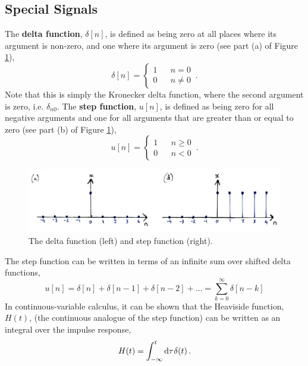 \subsection{Special Signals}
%
The \textbf{delta function}, $\delta[n]$, is defined as being zero at all places where its argument
is non-zero, and one where its argument is zero (see part (a) of Figure \ref{fig::lecture_1_delta_and_step}),
%
\begin{equation}
  \delta[n] = \left\{\begin{array}{ccl}
    1 & & n = 0 \\
    0 & & n \neq 0
  \end{array}\right. \,.
\end{equation}
%
Note that this is simply the Kronecker delta function, where the second argument is zero, i.e. $\delta_{n0}$.
The \textbf{step function}, $u[n]$, is defined as being zero for all negative arguments and one for
all arguments that are greater than or equal to zero (see part (b) of Figure
\ref{fig::lecture_1_delta_and_step}),
%
\begin{equation}
  u[n] = \left\{\begin{array}{ccl}
    1 & & n \geq 0 \\
    0 & & n < 0
  \end{array}\right. \,.
\end{equation}
%
\begin{figure}[!htb]
  \includegraphics[width=\textwidth]{images/lecture_1_delta_and_step.JPG}
  \caption{
    The delta function (left) and step function (right).
  }
  \label{fig::lecture_1_delta_and_step}
\end{figure}
%
The step function can be written in terms of an infinite sum over shifted delta functions,
%
\begin{equation}
  u[n] = \delta[n] + \delta[n-1] + \delta[n-2] + \hdots = \sum_{k=0}^\infty \delta[n-k]
\end{equation}
%
In continuous-variable calculus, it can be shown that the Heaviside function, $H(t)$, (the continuous
analogue of the step function) can be written as an integral over the impulse response,
%
\begin{displaymath}
  H(t) = \int^t_{-\infty} \mathrm{d}\tau\mkern1mu\delta(t) \,.
\end{displaymath}
